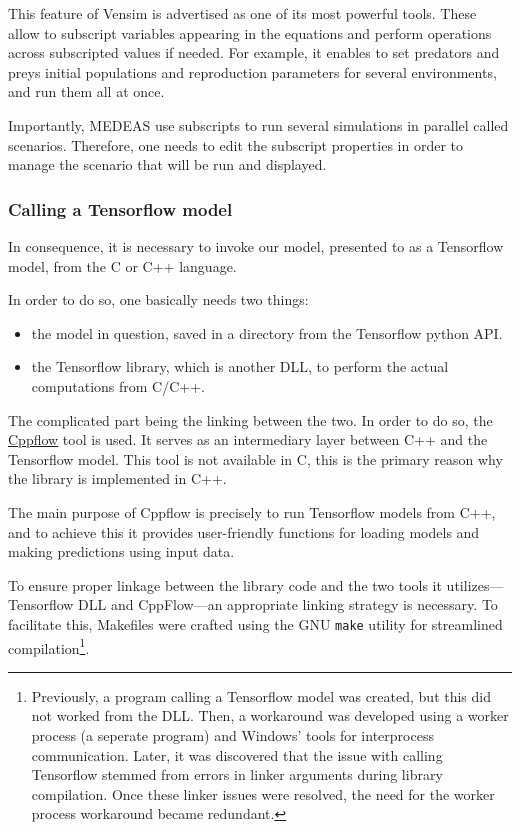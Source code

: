 This feature of Vensim is advertised as one of its most powerful tools. These allow to subscript variables appearing in the equations and perform operations across subscripted values if needed. For example, it enables to set predators and preys initial populations and reproduction parameters for several environments, and run them all at once. 

Importantly, MEDEAS use subscripts to run several simulations in parallel called scenarios. Therefore, one needs to edit the subscript properties in order to manage the scenario that will be run and displayed.

\subsubsection{Calling a Tensorflow model}

In consequence, it is necessary to invoke our model, presented to as a Tensorflow model, from the C or C++ language.

In order to do so, one basically needs two things:
\begin{itemize}
    \item the model in question, saved in a directory from the Tensorflow python API.
    \item the Tensorflow library, which is another DLL, to perform the actual computations from C/C++.
\end{itemize}

The complicated part being the linking between the two. In order to do so, the \href{https://serizba.github.io/cppflow/}{Cppflow} tool is used. It serves as an intermediary layer between C++ and the Tensorflow model. This tool is not available in C, this is the primary reason why the library is implemented in C++.

The main purpose of Cppflow is precisely to run Tensorflow models from C++, and to achieve this it provides user-friendly functions for loading models and making predictions using input data.

To ensure proper linkage between the library code and the two tools it utilizes—Tensorflow DLL and CppFlow—an appropriate linking strategy is necessary. To facilitate this, Makefiles were crafted using the GNU \texttt{make} utility for streamlined compilation\footnote{Previously, a program calling a Tensorflow model was created, but this did not worked from the DLL. Then, a workaround was developed using a worker process (a seperate program) and Windows' tools for interprocess communication. Later, it was discovered that the issue with calling Tensorflow stemmed from errors in linker arguments during library compilation. Once these linker issues were resolved, the need for the worker process workaround became redundant.}.

